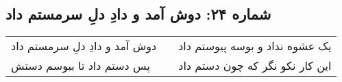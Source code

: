 \begin{center}
\section*{شماره ۲۴: دوش آمد و دادِ دلِ سرمستم داد}
\label{sec:024}
\begin{longtable}{l p{0.5cm} r}
دوش آمد و دادِ دلِ سرمستم داد
&&
یک عشوه نداد و بوسه پیوستم داد
\\
پس دستم داد تا ببوسم دستش
&&
این کار نکو نگر که چون دستم داد
\\
\end{longtable}
\end{center}
